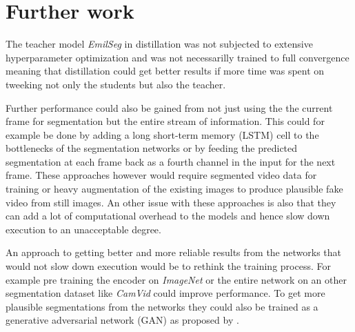 \documentclass{kththesis}
\begin{document}


\section{Further work}
The teacher model \textit{EmilSeg} in distillation
was not subjected to extensive hyperparameter optimization and was not
necessarilly trained to full convergence meaning that distillation could get
better results if more time was spent on tweeking not only the students but
also the teacher.

Further performance could also be gained from not just using the the current
frame for segmentation but the entire stream of information. This could for
example be done by adding a long short-term memory (LSTM) cell to the
bottlenecks of the segmentation networks or by feeding the predicted
segmentation at each frame back as a fourth channel in the input for the next
frame. These approaches however would require segmented video data for training
or heavy augmentation of the existing images to produce plausible fake video
from still images. An other issue with these approaches is also that they can
add a lot of computational overhead to the models and hence slow down execution to an
unacceptable degree.

An approach to getting better and more reliable results from the networks that
would not slow down execution would be to rethink the training process. For
example pre training the encoder on \textit{ImageNet} or the entire network on
an other segmentation dataset like \textit{CamVid} could improve performance. To
get more plausible segmentations from the networks they could also be trained as
a generative adversarial network
(GAN) as proposed by \textcite{AdverserialSegmentation}.
\end{document}
